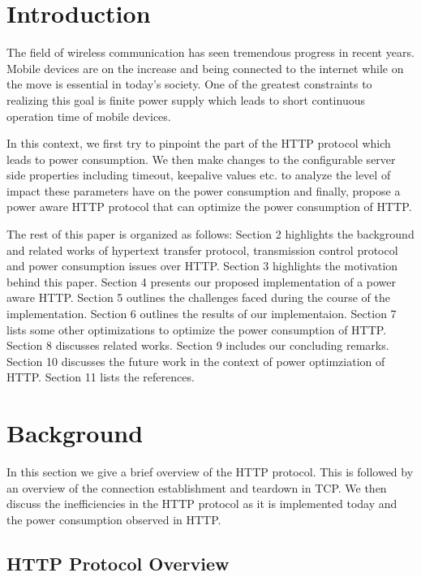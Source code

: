 \documentclass{sigplanconf}
\begin{document}
\section{Introduction}

The field of wireless communication has seen tremendous progress in recent years. Mobile devices are on the increase and being connected to the internet while on the move is essential in today’s society. One of the greatest constraints to realizing this goal is finite power supply which leads to short continuous operation time of mobile devices.

In this context, we first try to pinpoint the part of the HTTP protocol which leads to power consumption. We then make changes to the configurable server side properties including timeout, keepalive values etc. to analyze the level of impact these parameters have on the power consumption and finally, propose a power aware HTTP protocol that can optimize the power consumption of HTTP.

The rest of this paper is organized as follows: Section 2 highlights the background and related works of hypertext transfer protocol, transmission control protocol and power consumption issues over HTTP. Section 3 highlights the motivation behind this paper. Section 4 presents our proposed implementation of a power aware HTTP. Section 5 outlines the challenges faced during the course of the implementation. Section 6 outlines the results of our implementaion. Section 7 lists some other optimizations to optimize the power consumption of HTTP. Section 8 discusses related works. Section 9 includes our concluding remarks. Section 10 discusses the future work in the context of power optimziation of HTTP. Section 11 lists the references.

\section{Background}

In this section we give a brief overview of the HTTP protocol. This is followed by an overview of the connection establishment and teardown in TCP. We then discuss the inefficiencies in the HTTP protocol as it is implemented today and the power consumption observed in HTTP.

\subsection{HTTP Protocol Overview}
\end{document}
